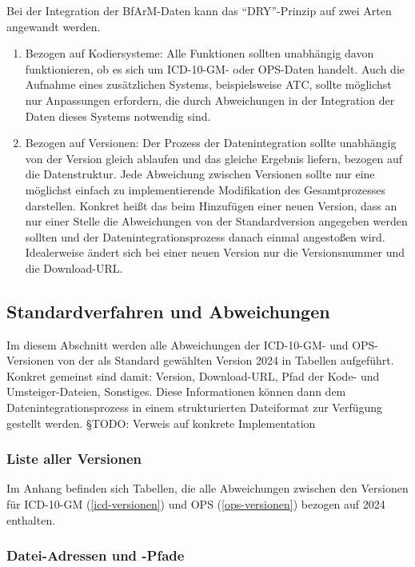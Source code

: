 \newpage %

Bei der Integration der BfArM-Daten kann das "`DRY"'-Prinzip auf zwei Arten angewandt werden.

\begin{enumerate}
\item Bezogen auf Kodiersysteme: Alle Funktionen sollten unabhängig davon funktionieren, ob es sich um ICD-10-GM- oder OPS-Daten handelt. Auch die Aufnahme eines zusätzlichen Systems, beispielsweise ATC, sollte möglichst nur Anpassungen erfordern, die durch Abweichungen in der Integration der Daten dieses Systems notwendig sind. 
\item Bezogen auf Versionen: Der Prozess der Datenintegration sollte unabhängig von der Version gleich ablaufen und das gleiche Ergebnis liefern, bezogen auf die Datenstruktur. Jede Abweichung zwischen Versionen sollte nur eine möglichst einfach zu implementierende Modifikation des Gesamtprozesses darstellen. Konkret heißt das beim Hinzufügen einer neuen Version, dass an nur einer Stelle die Abweichungen von der Standardversion angegeben werden sollten und der Datenintegrationsprozess danach einmal angestoßen wird. Idealerweise ändert sich bei einer neuen Version nur die Versionsnummer und die Download-URL. 
\end{enumerate}

\subsection{Standardverfahren und Abweichungen}
\label{struktdateiversionen}

Im diesem Abschnitt werden alle Abweichungen der ICD-10-GM- und OPS-Versionen von der als Standard gewählten Version 2024 in Tabellen aufgeführt. Konkret gemeinst sind damit: Version, Download-URL, Pfad der Kode- und Umsteiger-Dateien, Sonstiges. Diese Informationen können dann dem Datenintegrationsprozess in einem strukturierten Dateiformat zur Verfügung gestellt werden. {\color{blue} §TODO: Verweis auf konkrete Implementation}

\subsubsection{Liste aller Versionen}

Im Anhang befinden sich Tabellen, die alle Abweichungen zwischen den Versionen für ICD-10-GM (\ref{icd-versionen}) und OPS (\ref{ops-versionen}) bezogen auf 2024 enthalten.

\subsubsection{Datei-Adressen und -Pfade}

